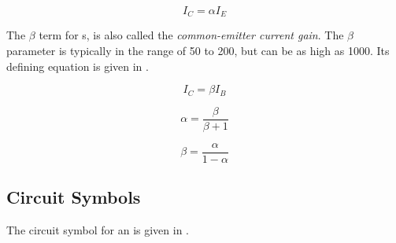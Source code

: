 \begin{equation}\label{eq:BJT_Alpha}
  I_{C} = \alpha I_{E}
\end{equation}

\begin{definition}\label{def:Common-Emitter_Current_Gain}\label{def:BJT-Beta}
  The $\beta$ term for s, is also called the \emph{common-emitter current gain}.
  The $\beta$ parameter is typically in the range of 50 to 200, but can be as high as 1000.
  Its defining equation is given in .
\end{definition}

\begin{equation}\label{eq:BJT_Beta}
  I_{C} = \beta I_{B}
\end{equation}

\begin{equation}\label{eq:BJT_Alpha-Beta_Terms}
  \alpha = \frac{\beta}{\beta + 1}
\end{equation}

\begin{equation}\label{eq:BJT_Beta-Alpha_Terms}
  \beta = \frac{\alpha}{1 - \alpha}
\end{equation}

\subsection{Circuit Symbols}\label{subsec:Circuit_Symbols}
The circuit symbol for an \NPNTransistor{}  is given in .


